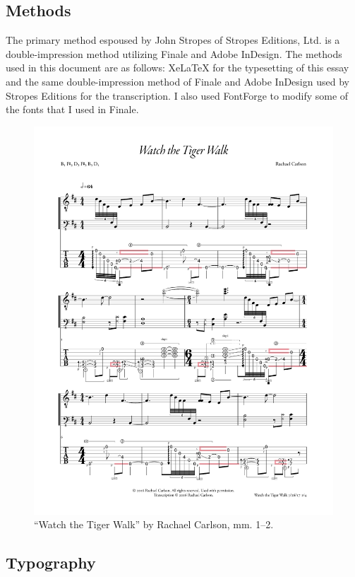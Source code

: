 \documentclass[unicode,hyperfootnotes=false,xetex,colorlinks=true,nofonts,nobib]{tufte-handout}
\begin{document}
\subsection{Methods}
\label{sec:methods}
The primary method espoused by John Stropes of Stropes Editions, Ltd. is a double-impression method utilizing Finale and Adobe InDesign. The methods used in this document are as follows: XeLaTeX for the typesetting of this essay and the same double-impression method of Finale and Adobe InDesign used by Stropes Editions for the transcription. I also used FontForge to modify some of the fonts that I used in Finale.
\begin{figure}\centering
        \includegraphics[width=1.00\textwidth]{watchTheTigerWalk20170326.pdf}
    \caption{``Watch the Tiger Walk'' by Rachael Carlson, mm. 1--2.}
    \label{fig:somthing}
  \end{figure}
\subsection{Typography}
\label{sec:typography}
\end{document}
